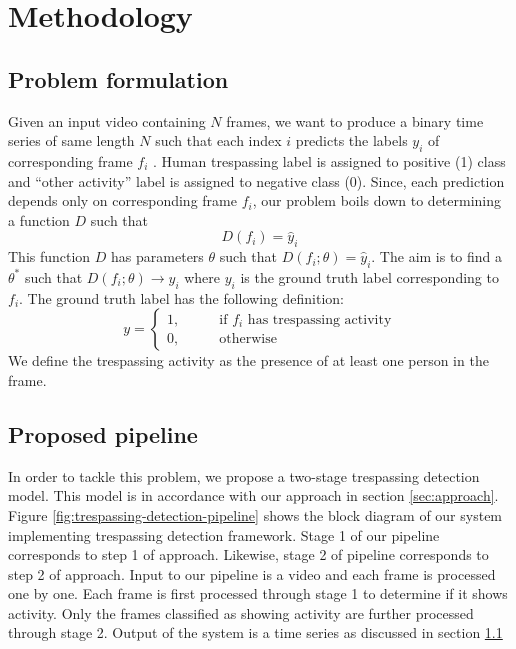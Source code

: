 \section{Methodology}
\subsection{Problem formulation}
\label{sec:prob-formulation}
Given an input video containing $N$ frames, we want to produce a binary time series of same length $N$ such that each index $i$ predicts the labels $y_i$ of corresponding frame $f_i$ . Human trespassing label is assigned to positive (1) class and ``other activity'' label is assigned to negative class (0). Since, each prediction depends only on corresponding frame $f_i$, our problem boils down to determining a function $D$ such that 
$$ D(f_i) = \hat{y}_i $$
This function $D$ has parameters $\theta$ such that $D(f_i;\theta) = \hat{y}_i$. The aim is to find a $\theta^*$ such that $D(f_i;\theta) \rightarrow y_i$ where $y_i$ is the ground truth label corresponding to $f_i$. The ground truth label has the following definition: 
$$y=
\begin{cases}
1,  &\qquad \textrm{if } f_i \textrm{ has trespassing activity} \\ 
0, 	&\qquad \textrm{otherwise}
\end{cases}
$$
We define the trespassing activity as the presence of at  least one person in the frame. 




\subsection{Proposed pipeline} 
In order to tackle this problem, we propose a two-stage trespassing detection model. This model is in accordance with our approach in section \ref{sec:approach}. Figure \ref{fig:trespassing-detection-pipeline} shows the block diagram of our system implementing trespassing detection framework. Stage 1 of our pipeline corresponds to step 1 of approach. Likewise, stage 2 of pipeline corresponds to step 2 of approach. Input to our pipeline is a video and each frame is processed one by one. Each frame is first processed through stage 1 to determine if it shows activity. Only the frames classified as showing activity are further processed through stage 2. Output of the system is a time series as discussed in section \ref{sec:prob-formulation}  



